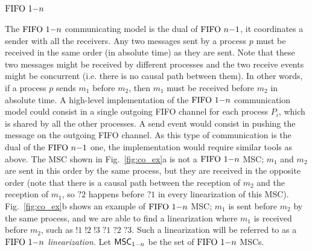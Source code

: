\subsection{$\text{FIFO } 1\mathsf{-}n$}
The $\text{FIFO } 1\mathsf{-}n$ communicating model is the dual of $\text{FIFO } n\mathsf{-}1$, it coordinates a sender with all the receivers. Any two messages sent by a process $p$ must be received in the same order (in absolute time) as they are sent. Note that these two messages might be received by different processes and the two receive events might be concurrent (i.e. there is no causal path between them). In other words, if a process $p$ sends $m_1$ before $m_2$, then $m_1$ must be received before $m_2$ in absolute time. A high-level implementation of the $\text{FIFO } 1\mathsf{-}n$ communication model could consist in a single outgoing FIFO channel for each process $P_i$, which is shared by all the other processes. A send event would consist in pushing the message on the outgoing FIFO channel.
As this type of communication is the dual of the $\text{FIFO } n\mathsf{-}1$ one, the implementation would require similar tools as above.
The MSC shown in Fig.~\ref{fig:co_ex}a is not a $\text{FIFO } 1\mathsf{-}n$ MSC; $m_1$ and $m_2$ are sent in this order by the same process, but they are received in the opposite order (note that there is a causal path between the reception of $m_2$ and the reception of $m_1$, so $?2$ happens before $?1$ in every linearization of this MSC). Fig.~\ref{fig:co_ex}b shows an example of $\text{FIFO } 1\mathsf{-}n$ MSC; $m_1$ is sent before $m_2$ by the same process, and we are able to find a linearization where $m_1$ is received before $m_2$, such as $!1\;!2\;!3\;?1\;?2\;?3$. Such a linearization will be referred to as a \emph{$\text{FIFO } 1\mathsf{-}n$ linearization}. Let $\mathsf{MSC}_{1\mathsf{-}n}$ be the set of $\text{FIFO } 1\mathsf{-}n$ MSCs.

